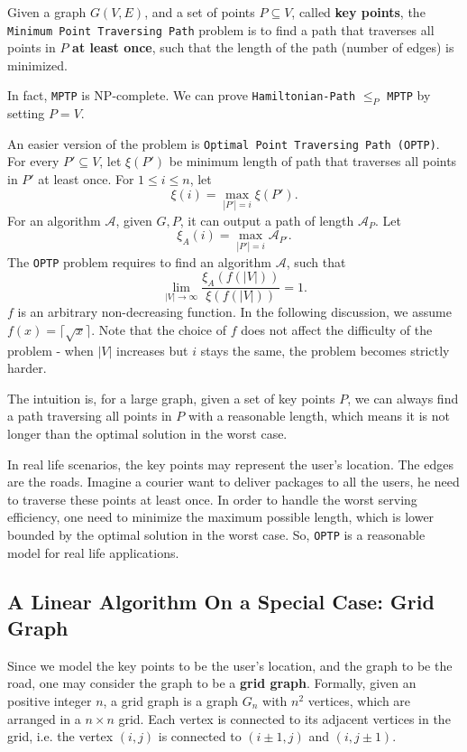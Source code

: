 \documentclass[12pt]{article}
\theoremstyle{plain}
\begin{document}
Given a graph $G(V,E)$, and a set of points $P\subseteq V$, called \textbf{key points}, the \texttt{Minimum Point Traversing Path} problem is to find a path that traverses all points in $P$ \textbf{at least once}, such that the length of the path (number of edges) is minimized. 

In fact, \texttt{MPTP} is NP-complete. We can prove \texttt{Hamiltonian-Path} $\le_P$ \texttt{MPTP} by setting $P=V$.

An easier version of the problem is \texttt{Optimal Point Traversing Path (OPTP)}. For every $P'\subseteq V$, let $\xi(P')$ be minimum length of path that traverses all points in $P'$ at least once. For $1\le i\le n$, let
$$\xi(i) = \max\limits_{|P'|=i} \xi(P').$$
For an algorithm $\mathcal{A}$, given $G,P$, it can output a path of length $\mathcal{A}_P$. Let
$$\xi_A(i) = \max\limits_{|P'|=i} \mathcal{A}_{P'}.$$
The \texttt{OPTP} problem requires to find an algorithm $\mathcal{A}$, such that
$$\lim\limits_{|V|\to \infty} \dfrac{\xi_A(f(|V|))}{\xi(f(|V|))}=1.$$
$f$ is an arbitrary non-decreasing function. In the following discussion, we assume $f(x)=\lceil\sqrt{x}\rceil$. Note that the choice of $f$ does not affect the difficulty of the problem - when $|V|$ increases but $i$ stays the same, the problem becomes strictly harder.

The intuition is, for a large graph, given a set of key points $P$, we can always find a path traversing all points in $P$ with a reasonable length, which means it is not longer than the optimal solution in the worst case. 

In real life scenarios, the key points may represent the user's location. The edges are the roads. Imagine a courier want to deliver packages to all the users, he need to traverse these points at least once. In order to handle the worst serving efficiency, one need to minimize the maximum possible length, which is lower bounded by the optimal solution in the worst case. So, \texttt{OPTP} is a reasonable model for real life applications.

\subsection{A Linear Algorithm On a Special Case: Grid Graph}

Since we model the key points to be the user's location, and the graph to be the road, one may consider the graph to be a \textbf{grid graph}. Formally, given an positive integer $n$, a grid graph is a graph $G_n$ with $n^2$ vertices, which are arranged in a $n\times n$ grid. Each vertex is connected to its adjacent vertices in the grid, i.e. the vertex $(i,j)$ is connected to $(i\pm 1,j)$ and $(i,j\pm 1)$.
\end{document}
